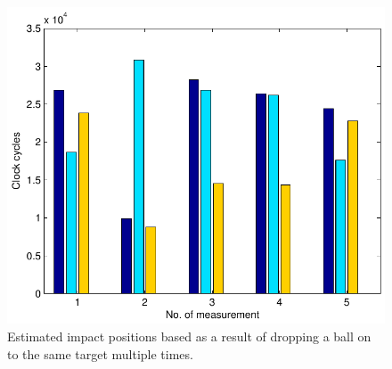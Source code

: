 \begin{figure}[htb]
	\centering
	\includegraphics[width=.8\textwidth]{figures/clockCycles30deg.pdf}
	\caption{Estimated impact positions based as a result of dropping a ball on to the same target multiple times.}
	\label{fig:clockCycles30deg}
\end{figure}

